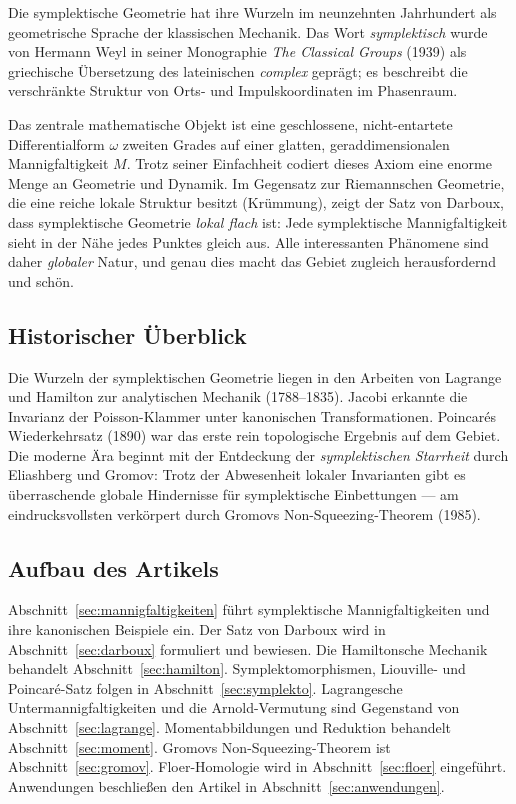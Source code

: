 \documentclass[12pt,a4paper]{amsart}
\theoremstyle{definition}
\begin{document}
Die symplektische Geometrie hat ihre Wurzeln im neunzehnten Jahrhundert als
geometrische Sprache der klassischen Mechanik.  Das Wort \emph{symplektisch}
wurde von Hermann Weyl in seiner Monographie \emph{The Classical Groups} (1939)
als griechische Übersetzung des lateinischen \emph{complex} geprägt; es
beschreibt die verschränkte Struktur von Orts- und Impulskoordinaten im
Phasenraum.

Das zentrale mathematische Objekt ist eine geschlossene, nicht-entartete
Differentialform $\omega$ zweiten Grades auf einer glatten, geraddimensionalen
Mannigfaltigkeit $M$.  Trotz seiner Einfachheit codiert dieses Axiom eine
enorme Menge an Geometrie und Dynamik.  Im Gegensatz zur Riemannschen Geometrie,
die eine reiche lokale Struktur besitzt (Krümmung), zeigt der Satz von Darboux,
dass symplektische Geometrie \emph{lokal flach} ist: Jede symplektische
Mannigfaltigkeit sieht in der Nähe jedes Punktes gleich aus.  Alle
interessanten Phänomene sind daher \emph{globaler} Natur, und genau dies macht
das Gebiet zugleich herausfordernd und schön.

\subsection*{Historischer Überblick}

Die Wurzeln der symplektischen Geometrie liegen in den Arbeiten von Lagrange
und Hamilton zur analytischen Mechanik (1788--1835).  Jacobi erkannte die
Invarianz der Poisson-Klammer unter kanonischen Transformationen.  Poincar\'{e}s
Wiederkehrsatz (1890) war das erste rein topologische Ergebnis auf dem Gebiet.
Die moderne Ära beginnt mit der Entdeckung der \emph{symplektischen Starrheit}
durch Eliashberg und Gromov: Trotz der Abwesenheit lokaler Invarianten gibt es
überraschende globale Hindernisse für symplektische Einbettungen --- am
eindrucksvollsten verkörpert durch Gromovs Non-Squeezing-Theorem (1985).

\subsection*{Aufbau des Artikels}

Abschnitt~\ref{sec:mannigfaltigkeiten} führt symplektische Mannigfaltigkeiten
und ihre kanonischen Beispiele ein.  Der Satz von Darboux wird in
Abschnitt~\ref{sec:darboux} formuliert und bewiesen.  Die Hamiltonsche Mechanik
behandelt Abschnitt~\ref{sec:hamilton}.  Symplektomorphismen, Liouville- und
Poincar\'{e}-Satz folgen in Abschnitt~\ref{sec:symplekto}.  Lagrangesche
Untermannigfaltigkeiten und die Arnold-Vermutung sind Gegenstand von
Abschnitt~\ref{sec:lagrange}.  Momentabbildungen und Reduktion behandelt
Abschnitt~\ref{sec:moment}.  Gromovs Non-Squeezing-Theorem ist
Abschnitt~\ref{sec:gromov}.  Floer-Homologie wird in Abschnitt~\ref{sec:floer}
eingeführt.  Anwendungen beschließen den Artikel in
Abschnitt~\ref{sec:anwendungen}.
\end{document}
